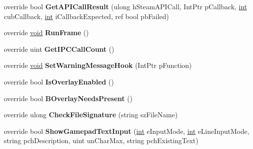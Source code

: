\begin{DoxyCompactItemize}
\item 
\hypertarget{classValve_1_1Steamworks_1_1CSteamUtils_a5b8c4df144b159eedf3d05724301ef61}{}override bool {\bfseries Get\+A\+P\+I\+Call\+Result} (ulong h\+Steam\+A\+P\+I\+Call, Int\+Ptr p\+Callback, \hyperlink{SDL__thread_8h_a6a64f9be4433e4de6e2f2f548cf3c08e}{int} cub\+Callback, \hyperlink{SDL__thread_8h_a6a64f9be4433e4de6e2f2f548cf3c08e}{int} i\+Callback\+Expected, ref bool pb\+Failed)\label{classValve_1_1Steamworks_1_1CSteamUtils_a5b8c4df144b159eedf3d05724301ef61}

\item 
\hypertarget{classValve_1_1Steamworks_1_1CSteamUtils_ad45ca1c8ced4f5f274a66ed96499931c}{}override \hyperlink{SDL__audio_8h_a52835ae37c4bb905b903cbaf5d04b05f}{void} {\bfseries Run\+Frame} ()\label{classValve_1_1Steamworks_1_1CSteamUtils_ad45ca1c8ced4f5f274a66ed96499931c}

\item 
\hypertarget{classValve_1_1Steamworks_1_1CSteamUtils_a633b8fd09392950eac0bbfd0945f8fd5}{}override uint {\bfseries Get\+I\+P\+C\+Call\+Count} ()\label{classValve_1_1Steamworks_1_1CSteamUtils_a633b8fd09392950eac0bbfd0945f8fd5}

\item 
\hypertarget{classValve_1_1Steamworks_1_1CSteamUtils_af34d70923245332d13b24b28ba406e38}{}override \hyperlink{SDL__audio_8h_a52835ae37c4bb905b903cbaf5d04b05f}{void} {\bfseries Set\+Warning\+Message\+Hook} (Int\+Ptr p\+Function)\label{classValve_1_1Steamworks_1_1CSteamUtils_af34d70923245332d13b24b28ba406e38}

\item 
\hypertarget{classValve_1_1Steamworks_1_1CSteamUtils_ac908638f0a3aeb8c63c2b49da96d7361}{}override bool {\bfseries Is\+Overlay\+Enabled} ()\label{classValve_1_1Steamworks_1_1CSteamUtils_ac908638f0a3aeb8c63c2b49da96d7361}

\item 
\hypertarget{classValve_1_1Steamworks_1_1CSteamUtils_ac4e03a9f3bb237dae44266558bce337d}{}override bool {\bfseries B\+Overlay\+Needs\+Present} ()\label{classValve_1_1Steamworks_1_1CSteamUtils_ac4e03a9f3bb237dae44266558bce337d}

\item 
\hypertarget{classValve_1_1Steamworks_1_1CSteamUtils_ad7401bd13f0ac8a6fd8991e5cd7182ab}{}override ulong {\bfseries Check\+File\+Signature} (string sz\+File\+Name)\label{classValve_1_1Steamworks_1_1CSteamUtils_ad7401bd13f0ac8a6fd8991e5cd7182ab}

\item 
\hypertarget{classValve_1_1Steamworks_1_1CSteamUtils_a62908db16e75f19e246eba8f619570b1}{}override bool {\bfseries Show\+Gamepad\+Text\+Input} (\hyperlink{SDL__thread_8h_a6a64f9be4433e4de6e2f2f548cf3c08e}{int} e\+Input\+Mode, \hyperlink{SDL__thread_8h_a6a64f9be4433e4de6e2f2f548cf3c08e}{int} e\+Line\+Input\+Mode, string pch\+Description, uint un\+Char\+Max, string pch\+Existing\+Text)\label{classValve_1_1Steamworks_1_1CSteamUtils_a62908db16e75f19e246eba8f619570b1}


\end{DoxyCompactItemize}
